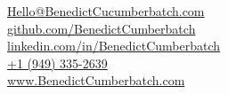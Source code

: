 \documentclass[]{two-column-resume}
\begin{document}
{
\large  %
{}
	\faEnvelope \hspace{0.1cm} \href{mailto:Hello@BenedictCucumberbatch.com}{Hello@BenedictCucumberbatch.com}\\
	\faGithub \hspace{0.1cm} \href{https://github.com/BenedictCumberbatch}{github.com/BenedictCumberbatch}\\
	\faLinkedinSquare \hspace{0.1cm} \href{https://www.linkedin.com/in/BenedictCumberbatch/}{linkedin.com/in/BenedictCumberbatch}\\
    \faPhone \hspace{0.1cm} \href{tel:19493352639}{+1 (949) 335-2639} \\
    \faGlobe \hspace{0.1cm} \href{https://www.BenedictCumberbatch.com}{www.BenedictCumberbatch.com}
}
\end{document}
